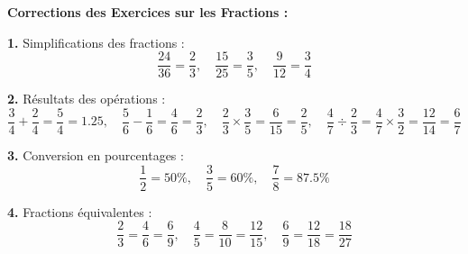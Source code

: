 \documentclass{article}
\begin{document}
\vspace{5pt}

\begin{tcolorbox}[colback=green!10!white, colframe=green!75!black, title=\textcolor{white}{\textbf{Corrections}}, sharp corners=south, boxrule=0.8mm]
    
    \textbf{Corrections des Exercices sur les Fractions :}
    
    \vspace{5pt}
    
    \textbf{1.} Simplifications des fractions :
    \[
    \frac{24}{36} = \frac{2}{3}, \quad \frac{15}{25} = \frac{3}{5}, \quad \frac{9}{12} = \frac{3}{4}
    \]
    
    \vspace{10pt}
    
    \textbf{2.} Résultats des opérations :
    \[
    \frac{3}{4} + \frac{2}{4} = \frac{5}{4} = 1.25, \quad \frac{5}{6} - \frac{1}{6} = \frac{4}{6} = \frac{2}{3}, \quad \frac{2}{3} \times \frac{3}{5} = \frac{6}{15} = \frac{2}{5}, \quad \frac{4}{7} \div \frac{2}{3} = \frac{4}{7} \times \frac{3}{2} = \frac{12}{14} = \frac{6}{7}
    \]
    
    \vspace{10pt}
    
    \textbf{3.} Conversion en pourcentages :
    \[
    \frac{1}{2} = 50\%, \quad \frac{3}{5} = 60\%, \quad \frac{7}{8} = 87.5\%
    \]
    
    \vspace{10pt}
    
    \textbf{4.} Fractions équivalentes :
    \[
    \frac{2}{3} = \frac{4}{6} = \frac{6}{9}, \quad \frac{4}{5} = \frac{8}{10} = \frac{12}{15}, \quad \frac{6}{9} = \frac{12}{18} = \frac{18}{27}
    \]
\end{tcolorbox}
\end{document}
